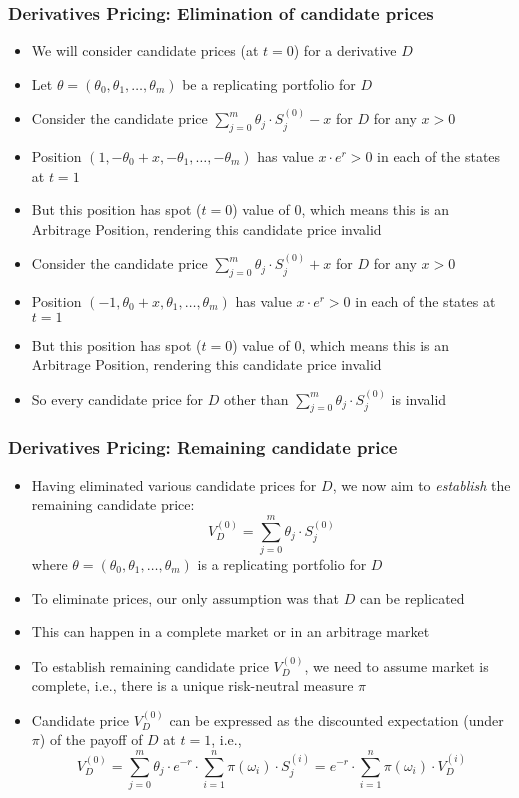 \documentclass{beamer}
\begin{document}
\begin{frame}
\frametitle{Derivatives Pricing: Elimination of candidate prices}
\begin{itemize}
\item We will consider candidate prices (at $t=0$) for a derivative $D$
\item Let $	\theta = (\theta_0, \theta_1, \ldots, \theta_m)$ be a replicating portfolio for $D$
\item Consider the candidate price $\sum_{j=0}^m \theta_j \cdot S_j^{(0)} - x$ for $D$ for any $x > 0$
\item Position $(1, -\theta_0 + x, -\theta_1, \ldots, -\theta_m)$ has value $x \cdot e^r > 0$ in each of the states at $t=1$
\item But this position has spot ($t=0$) value of 0, which means this is an Arbitrage Position, rendering this candidate price invalid
\item Consider the candidate price $\sum_{j=0}^m \theta_j \cdot S_j^{(0)} + x$ for $D$ for any $x > 0$
\item Position $(-1, \theta_0 + x, \theta_1, \ldots, \theta_m)$ has value $x \cdot e^r > 0$ in each of the states at $t=1$
\item But this position has spot ($t=0$) value of 0, which means this is an Arbitrage Position, rendering this candidate price invalid
\item So every candidate price for $D$ other than $\sum_{j=0}^m \theta_j \cdot S_j^{(0)}$ is invalid
\end{itemize}
\end{frame}

\begin{frame}
\frametitle{Derivatives Pricing: Remaining candidate price}
\begin{itemize}
\item Having eliminated various candidate prices for $D$, we now aim to {\em establish} the remaining candidate price:
\begin{equation}
V_D^{(0)} = \sum_{j=0}^m \theta_j \cdot S_j^{(0)} \label{eq:remcandidateprice}
\end{equation}
where $\theta = (\theta_0, \theta_1, \ldots, \theta_m)$ is a replicating portfolio for $D$
\item To eliminate prices, our only assumption was that $D$ can be replicated
\item This can happen in a complete market or in an arbitrage market
\item To establish remaining candidate price $V_D^{(0)}$, we need to assume market is complete, i.e., there is a unique risk-neutral measure $\pi$
\item Candidate price $V_D^{(0)}$ can be expressed as the discounted expectation (under $\pi$) of the payoff of $D$ at $t=1$, i.e.,
\begin{equation}
V_D^{(0)} = \sum_{j=0}^m \theta_j \cdot e^{-r} \cdot \sum_{i=1}^n \pi(\omega_i) \cdot S_j^{(i)} = e^{-r} \cdot \sum_{i=1}^n \pi(\omega_i) \cdot V_D^{(i)} \label{eq:derivdiscexp}
\end{equation}
\end{itemize}
\end{frame}
\end{document}
